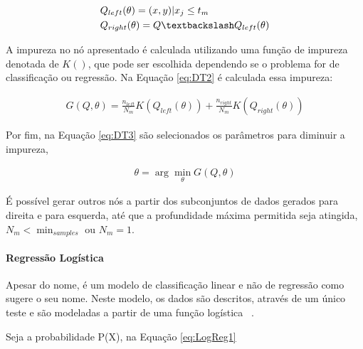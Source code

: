           \begin{equation}\label{eq:DT}
            \begin{aligned}
              & Q_{left}(\theta) = (x,y)|x_{j} \leq t_{m} \\
              & Q_{right}(\theta) = Q \textbackslash Q_{left}(\theta)
          \end{aligned}
          \end{equation}


          A impureza no nó apresentado é calculada utilizando uma função de impureza denotada de $K()$, que pode ser escolhida dependendo se o 
          problema for de classificação ou regressão. Na Equação \ref{eq:DT2} é calculada essa impureza:

          \begin{equation}\label{eq:DT2}
            \begin{aligned}
              G(Q,\theta) = \frac{n_{left}}{N_{m}}K(Q_{left}(\theta)) + \frac{n_{right}}{N_{m}}K(Q_{right}(\theta))
          \end{aligned}
          \end{equation}


          Por fim, na Equação \ref{eq:DT3} são selecionados os parâmetros para diminuir a impureza,

          \begin{equation}\label{eq:DT3}
            \begin{aligned}
              \theta = \arg\min_{\theta}G(Q,\theta)
          \end{aligned} 
          \end{equation}

          É possível gerar outros nós a partir dos subconjuntos de dados gerados para direita e para esquerda, 
          até que a profundidade máxima permitida seja atingida, $N_{m} < \min_{samples}$ ou $N_{m} = 1$.

        \paragraph{Regressão Logística}

          Apesar do nome, é um modelo de classificação linear e não de regressão como sugere o seu nome. Neste modelo, os dados
          são descritos, através de um único teste e são modeladas a partir de uma função logística ~\cite{nasrabadi2007pattern}.

          Seja a probabilidade P(X), na Equação \ref{eq:LogReg1}


